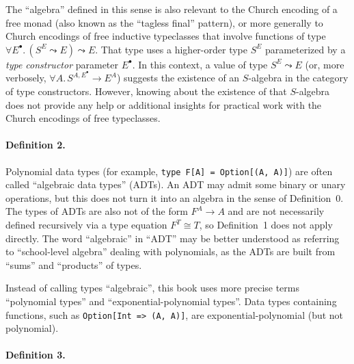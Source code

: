 The \textsf{``}algebra\textsf{''} defined in this sense is also relevant to the Church
encoding of a free monad (also known as the \textsf{``}tagless final\textsf{''}
pattern), or more generally to Church encodings of free inductive
typeclasses that involve functions of type $\forall E^{\bullet}.\,(S^{E}\leadsto E)\leadsto E$.
That type uses a higher-order type $S^{E}$ parameterized by a \emph{type
constructor} parameter $E^{\bullet}$. In this context, a value of
type $S^{E}\leadsto E$ (or, more verbosely, $\forall A.\,S^{A,E^{\bullet}}\rightarrow E^{A}$)
suggests the existence of an $S$-algebra in the category of type
constructors. However, knowing about the existence of that $S$-algebra
does not provide any help or additional insights for practical work
with the Church encodings of free typeclasses.

\paragraph{Definition 2.}

Polynomial data types (for example, \lstinline!type F[A] = Option[(A, A)]!)
are often called \textquotedblleft algebraic data types\textquotedblright{}
(ADTs). An ADT may admit some binary or unary operations, but this
does not turn it into an algebra in the sense of Definition~0. The
types of ADTs are also not of the form $F^{A}\rightarrow A$ and are
not necessarily defined recursively via a type equation $F^{T}\cong T$,
so Definition~1 does not apply directly. The word \textsf{``}algebraic\textsf{''}
in \textsf{``}ADT\textsf{''} may be better understood as referring to \textsf{``}school-level
algebra\textsf{''} dealing with polynomials, as the ADTs are built from \textsf{``}sums\textsf{''}
and \textsf{``}products\textsf{''} of types. 

Instead of calling types \textsf{``}algebraic\textsf{''}, this book uses more precise
terms \textquotedblleft polynomial types\textquotedblright{} and \textquotedblleft exponential-polynomial
types\textquotedblright . Data types containing functions, such as
\lstinline!Option[Int => (A, A)]!, are exponential-polynomial (but
not polynomial).

\paragraph{Definition 3.}

